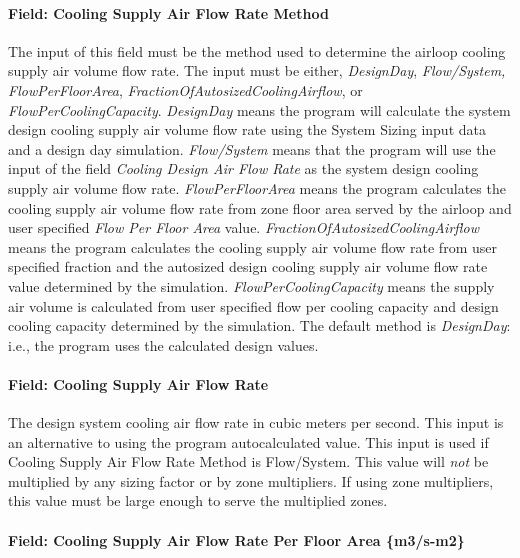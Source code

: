 \paragraph{Field: Cooling Supply Air Flow Rate Method}\label{field-cooling-supply-air-flow-rate-method}

The input of this field must be the method used to determine the airloop cooling supply air volume flow rate. The input must be either, \emph{DesignDay}, \emph{Flow/System,} \emph{FlowPerFloorArea}, \emph{FractionOfAutosizedCoolingAirflow}, or \emph{FlowPerCoolingCapacity}. \emph{DesignDay} means the program will calculate the system design cooling supply air volume flow rate using the System Sizing input data and a design day simulation. \emph{Flow/System} means that the program will use the input of the field \emph{Cooling Design Air Flow Rate} as the system design cooling supply air volume flow rate. \emph{FlowPerFloorArea} means the program calculates the cooling supply air volume flow rate from zone floor area served by the airloop and user specified \emph{Flow Per Floor Area} value. \emph{FractionOfAutosizedCoolingAirflow} means the program calculates the cooling supply air volume flow rate from user specified fraction and the autosized design cooling supply air volume flow rate value determined by the simulation. \emph{FlowPerCoolingCapacity} means the supply air volume is calculated from user specified flow per cooling capacity and design cooling capacity determined by the simulation. The default method is \emph{DesignDay}: i.e., the program uses the calculated design values.

\paragraph{Field: Cooling Supply Air Flow Rate}\label{field-cooling-supply-air-flow-rate}

The design system cooling air flow rate in cubic meters per second. This input is an alternative to using the program autocalculated value. This input is used if Cooling Supply Air Flow Rate Method is Flow/System. This value will \emph{not} be multiplied by any sizing factor or by zone multipliers. If using zone multipliers, this value must be large enough to serve the multiplied zones.

\paragraph{Field: Cooling Supply Air Flow Rate Per Floor Area \{m3/s-m2\}}\label{field-cooling-supply-air-flow-rate-per-floor-area-m3s-m2}

